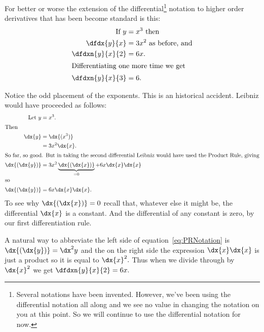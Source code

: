 For better or worse the extension of the differential\footnote{Several
  notations have been invented. However, we've been using the
  differential notation all along and we see no value in changing the
  notation on you at this point. So we will continue to use the
  differential notation for now.

} notation to higher order derivatives that has been
become standard is this:
\begin{align*}
  \text{ If } y &= x^3 \text{ then}\\
  \dfdx{y}{x}&= 3x^2 \text{ as before, and}\\
  \dfdxn{y}{x}{2} &= 6x.\\
\intertext{Differentiating one more time we get}
  \dfdxn{y}{x}{3} &= 6.
\end{align*}

Notice the odd placement of the exponents. This is an historical
accident. Leibniz would have proceeded as follows:
\begin{align}
\nonumber  \text{Let } y&= x^3.\\
  \intertext{Then}
\nonumber  \dx{y}&= \dx{(x^3)}\\
\nonumber               &= 3x^2\dx{x}.\\
  \intertext{So far, so good. But in taking the second differential
  Leibniz would have used the Product Rule, giving}
\nonumber  \dx{(\dx{y})} &= 3x^2\underbrace{\dx{(\dx{x})}}_{=0} +
                                       6x\dx{x}\dx{x}\\
  \intertext{so}
\label{eq:PRNotation} \dx{(\dx{y})} &=    6x\dx{x}\dx{x}.
\end{align}
To see why  $\dx{(\dx{x})}=0$ recall that, whatever else it might
  be, the differential $\dx{x}$ is a constant. And the differential of
  any constant is zero, by our first differentiation rule.

  A natural way to abbreviate the left side of
  equation~\ref{eq:PRNotation} is $\dx{(\dx{y})}=\dx^2y$ and the on the
  right side the expression $\dx{x}\dx{x}$ is just a product so it is equal
  to $\dx{x}^2.$ Thus when we divide through by $\dx{x}^2$ we get
  $\dfdxn{y}{x}{2}=6x.$

